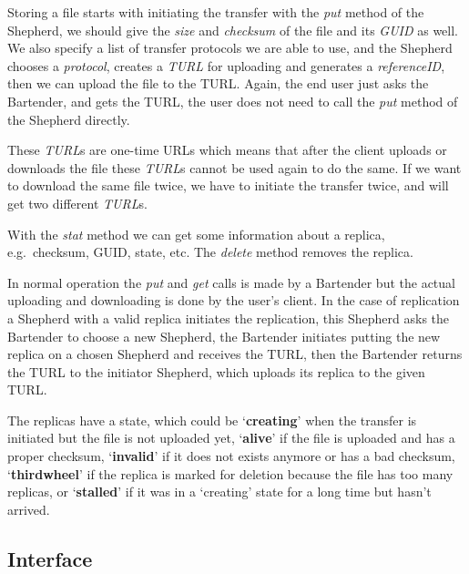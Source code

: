 \documentclass{book}
\begin{document}
Storing a file starts with initiating the transfer with the \emph{put} method of the Shepherd, we should give the \emph{size} and \emph{checksum} of the file and its \emph{GUID} as well. We also specify a list of transfer protocols we are able to use, and the Shepherd chooses a \emph{protocol}, creates a \emph{TURL} for uploading and generates a \emph{referenceID}, then we can upload the file to the TURL. Again, the end user just asks the Bartender, and gets the TURL, the user does not need to call the \emph{put} method of the Shepherd directly.

These \emph{TURL}s are one-time URLs which means that after the client uploads or downloads the file these \emph{TURL}s cannot be used again to do the same. If we want to download the same file twice, we have to initiate the transfer twice, and will get two different \emph{TURL}s.

With the \emph{stat} method we can get some information about a replica, e.g.~checksum, GUID, state, etc. The \emph{delete} method removes the replica.

In normal operation the \emph{put} and \emph{get} calls is made by a Bartender but the actual uploading and downloading is done by the user's client. In the case of replication a Shepherd with a valid replica initiates the replication, this Shepherd asks the Bartender to choose a new Shepherd, the Bartender initiates putting the new replica on a chosen Shepherd and receives the TURL, then the Bartender returns the TURL to the initiator Shepherd, which uploads its replica to the given TURL.

The replicas have a state, which could be `\textbf{creating}' when the transfer is initiated but the file is not uploaded yet, `\textbf{alive}' if the file is uploaded and has a proper checksum, `\textbf{invalid}' if it does not exists anymore or has a bad checksum, `\textbf{thirdwheel}' if the replica is marked for deletion because the file has too many replicas, or `\textbf{stalled}' if it was in a `creating' state for a long time but hasn't arrived.


\subsection{Interface} %
\end{document}
